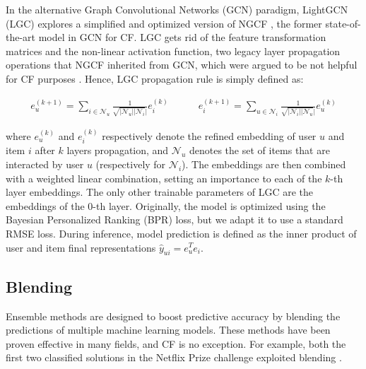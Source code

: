 \documentclass[sigconf]{acmart}
\begin{document}
In the alternative Graph Convolutional Networks (GCN) \cite{gcn} paradigm, LightGCN (LGC) \cite{lightgcn} explores a simplified and optimized version of NGCF \cite{ngcf}, the former state-of-the-art model in GCN for CF. LGC gets rid of the feature transformation matrices and the non-linear activation function, two legacy layer propagation operations that NGCF inherited from GCN, which were argued to be not helpful for CF purposes \cite{lightgcn}. Hence, LGC propagation rule is simply defined as:

\footnotesize
\begin{align*}
e_u^{(k+1)} = \sum_{i \in \mathcal{N}_u} \frac{1}{\sqrt{|\mathcal{N}_u||\mathcal{N}_i}|} e_i^{(k)} 
\qquad\quad
e_i^{(k+1)} = \sum_{u \in \mathcal{N}_i}  \frac{1}{\sqrt{|\mathcal{N}_i||\mathcal{N}_u}|} e_u^{(k)}
\end{align*}
\normalsize

where $e_u^{(k)}$ and $e_i^{(k)}$ respectively denote the refined embedding of user $u$ and item $i$ after $k$ layers propagation, and $\mathcal{N}_u$ denotes the set of items that are interacted by user $u$ (respectively for $\mathcal{N}_i$).
The embeddings are then combined with a weighted linear combination, setting an importance to each of the $k$-th layer embeddings.
The only other trainable parameters of LGC are the embeddings of the $0$-th layer.
Originally, the model is optimized using the Bayesian Personalized Ranking (BPR) loss, but we adapt it to use a standard RMSE loss.
During inference, model prediction is defined as the inner product of user and item final representations $\hat{
y}_{ui} = e_u^T e_i$.

\subsection{Blending}
Ensemble methods are designed to boost predictive accuracy by blending the predictions of multiple machine learning models. 
These methods have been proven effective in many fields, and CF is no exception. 
For example, both the first two classified solutions in the Netflix Prize challenge exploited blending \cite{blending1, blending2}.
\end{document}
